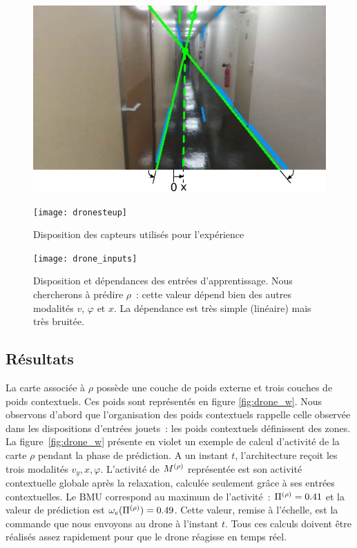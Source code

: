 \documentclass[../main]{subfiles}
\begin{document}
\begin{figure}
	\begin{minipage}{0.5\textwidth}
	\includegraphics[width=\textwidth]{visudrone.pdf}
	\end{minipage}
	\begin{minipage}{0.5\textwidth}
	\texttt{[image: dronesteup]}
	\end{minipage}
	\caption{Disposition des capteurs utilisés pour l'expérience}
	\label{fig:drone}
	\end{figure}

\begin{figure}
	\centering\texttt{[image: drone\_inputs]}
	\caption{Disposition et dépendances des entrées d'apprentissage. Nous chercherons à prédire $\rho$~: cette valeur dépend bien des autres modalités $v$, $\varphi$ et $x$. La dépendance est très simple (linéaire) mais très bruitée. \label{fig:drone_inp}}
\end{figure}


\subsection{Résultats}

La carte associée à $\rho$ possède une couche de poids externe et trois couches de poids contextuels. 
Ces poids sont représentés en figure \ref{fig:drone_w}. 
Nous observons d'abord que l'organisation des poids contextuels rappelle celle observée dans les dispositions d'entrées jouets~: les poids contextuels définissent des zones. 
La figure~\ref{fig:drone_w} présente en violet un exemple de calcul d'activité de la carte $\rho$ pendant la phase de prédiction.
A un instant $t$, l'architecture reçoit les trois modalités $v_y, x, \varphi$.
L'activité de $M^{({\rho})}$ représentée est son activité contextuelle globale après la relaxation, calculée seulement grâce à ses entrées contextuelles.
Le BMU correspond au maximum de l'activité~: $\Pi^{({\rho})} = 0.41$ et la valeur de prédiction est $\omega_e(\Pi^{({\rho})}) = 0.49$. Cette valeur, remise à l'échelle, est la commande que nous envoyons au drone à l'instant $t$.
Tous ces calculs doivent être réalisés assez rapidement pour que le drone réagisse en temps réel.
\end{document}
